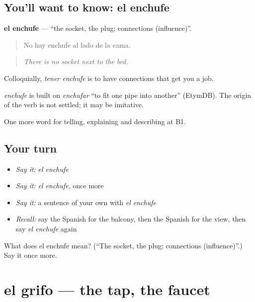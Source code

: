 \subsection*{You'll want to know: el enchufe}
\textbf{el enchufe} — \textquotedblleft{}the socket, the plug; connections (influence)\textquotedblright{}.

\begin{quote}
No hay enchufe al lado de la cama.
\end{quote}

\begin{quote}
\emph{There is no socket next to the bed.}
\end{quote}

Colloquially, \emph{tener enchufe} is to have connections that get you a job.

\begin{cousinweb}
\emph{enchufe} is built on \emph{enchufar} \textquotedblleft{}to fit one pipe into another\textquotedblright{} (EtymDB). The origin of the verb is not settled; it may be imitative.
\end{cousinweb}

\begin{grammarlens}[title={What you've built}]
One more word for telling, explaining and describing at B1.
\end{grammarlens}

\subsection*{Your turn}
\begin{itemize}
\raggedright
  \item \emph{Say it:} \emph{el enchufe}
  \item \emph{Say it:} \emph{el enchufe}, once more
  \item \emph{Say it:} a sentence of your own with \emph{el enchufe}
  \item \emph{Recall:} say the Spanish for the balcony, then the Spanish for the view, then say \emph{el enchufe} again
\end{itemize}

\begin{tcolorbox}[breakable,colback=teal!4,colframe=teal!35!black,title={Before you move on}]
What does el enchufe mean? (\textquotedblleft{}The socket, the plug; connections (influence)\textquotedblright{}.) Say it once more.
\end{tcolorbox}
\section[el grifo]{el grifo — the tap, the faucet}


